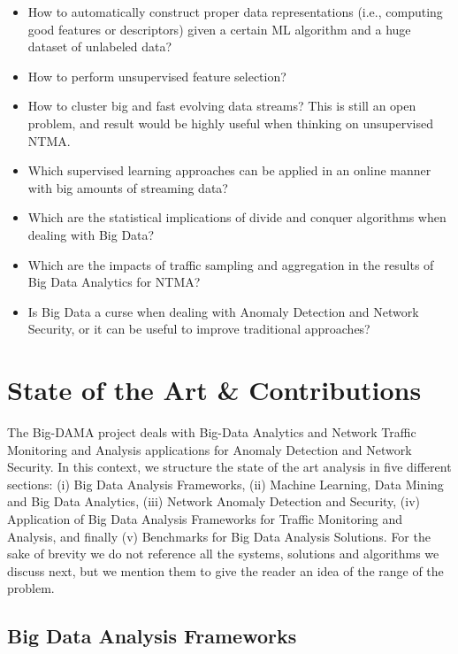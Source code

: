 \documentclass[10pt, conference, letterpaper]{IEEEtran}
\begin{document}
\begin{itemize}
\item How to automatically construct proper data representations (i.e., computing good features or descriptors) given a certain ML algorithm and a huge dataset of unlabeled data?
\item How to perform unsupervised feature selection?
\item How to cluster big and fast evolving data streams? This is still an open problem, and result would be highly useful when thinking on unsupervised NTMA.
\item Which supervised learning approaches can be applied in an online manner with big amounts of streaming data?
\item Which are the statistical implications of divide and conquer algorithms when dealing with Big Data?
\item Which are the impacts of traffic sampling and aggregation in the results of Big Data Analytics for NTMA?
\item Is Big Data a curse when dealing with Anomaly Detection and Network Security, or it can be useful to improve traditional approaches?
\end{itemize}

\section{State of the Art \& Contributions}\label{sectionII}

The Big-DAMA project deals with Big-Data Analytics and Network Traffic Monitoring and Analysis applications for Anomaly Detection and Network Security. In this context, we structure the state of the art analysis in five different sections: (i) Big Data Analysis Frameworks, (ii) Machine Learning, Data Mining and Big Data Analytics, (iii) Network Anomaly Detection and Security, (iv) Application of Big Data Analysis Frameworks for Traffic Monitoring and Analysis, and finally (v) Benchmarks for Big Data Analysis Solutions. For the sake of brevity we do not reference all the systems, solutions and algorithms we discuss next, but we mention them to give the reader an idea of the range of the problem.

\subsection{Big Data Analysis Frameworks}
\end{document}
